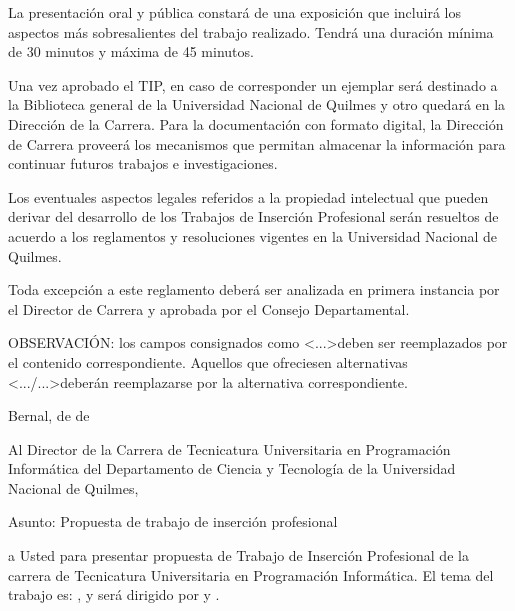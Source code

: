 \articulo La presentación oral y pública constará de una exposición que incluirá
los aspectos más sobresalientes del trabajo realizado. Tendrá una duración mínima de
30 minutos y máxima de 45 minutos.





\articulo Una vez aprobado el TIP, en caso de corresponder un ejemplar será destinado a la
Biblioteca general de la Universidad Nacional de Quilmes y otro quedará en la
Dirección de la Carrera. Para la documentación con formato digital, la Dirección de Carrera
proveerá los mecanismos que permitan almacenar la información para continuar futuros trabajos e investigaciones.

\articulo Los eventuales aspectos legales referidos a la propiedad
intelectual que pueden derivar del desarrollo de los Trabajos de Inserción Profesional
serán resueltos de acuerdo a los reglamentos y resoluciones vigentes en la
Universidad Nacional de Quilmes.


\articulo Toda excepción a este reglamento deberá ser analizada en
primera instancia por el Director de Carrera y aprobada por el Consejo Departamental.

\newpage
\resetAnexosCounter
{}

OBSERVACIÓN: los campos consignados como \textless...\textgreater deben ser reemplazados
por el contenido correspondiente. Aquellos que ofreciesen alternativas
 \textless.../...\textgreater deberán reemplazarse por la alternativa
 correspondiente.

\begin{flushright}
Bernal,  de  de \end{flushright}

Al Director de la Carrera de Tecnicatura Universitaria en Programación Informática del
Departamento de Ciencia y Tecnología de la
Universidad Nacional de Quilmes,\\

\hrulefill

Asunto: Propuesta de trabajo de inserción profesional

 a Usted para presentar 
propuesta de Trabajo de Inserción Profesional de la carrera de Tecnicatura
Universitaria en Programación Informática. El tema del trabajo es: , y será dirigido por  y .

